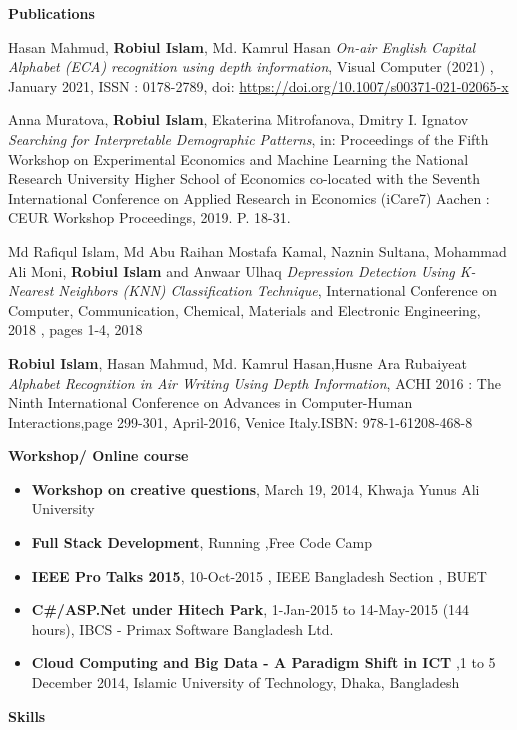 \documentclass[letterpaper,10pt]{article}
\newcommand{\resitem}[1]{\item #1 \vspace{-2pt}}
\newcommand{\resheading}[1]{{\large \colorbox{mygrey}{\begin{minipage}{\textwidth}{\textbf{#1 \vphantom{p\^{E}}}}\end{minipage}}}}
\begin{document}
\resheading{Publications}
\begin{thebibliography}{}

 \bibitem{}
 
 Hasan Mahmud, \textbf{Robiul Islam}, Md. Kamrul Hasan \emph{On-air English Capital Alphabet (ECA) recognition using depth information}, Visual Computer (2021) , January 2021,  ISSN : 0178-2789, doi: \url{https://doi.org/10.1007/s00371-021-02065-x} 

\bibitem{}
Anna Muratova, \textbf{Robiul Islam}, Ekaterina Mitrofanova, Dmitry I. Ignatov \emph{Searching for Interpretable Demographic Patterns}, in: Proceedings of the Fifth Workshop on Experimental Economics and Machine Learning the National Research University Higher School of Economics co-located with the Seventh International Conference on Applied Research in Economics (iCare7) Aachen : CEUR Workshop Proceedings, 2019. P. 18-31.

\bibitem{}
Md Rafiqul Islam, Md Abu Raihan Mostafa Kamal, Naznin Sultana, Mohammad Ali Moni, \textbf{Robiul Islam} and Anwaar Ulhaq \emph{Depression Detection Using K-Nearest Neighbors (KNN) Classification Technique}, International Conference on Computer, Communication, Chemical, Materials and Electronic Engineering, 2018 , pages 1-4, 2018  

\bibitem{}
\textbf{Robiul Islam}, Hasan Mahmud, Md. Kamrul Hasan,Husne Ara Rubaiyeat \emph{Alphabet Recognition in Air Writing Using Depth Information}, ACHI 2016 : The Ninth International Conference on Advances in Computer-Human Interactions,page 299-301, April-2016, Venice Italy.ISBN: 978-1-61208-468-8


\end{thebibliography}
\resheading{Workshop/ Online course }
\begin{itemize}

\resitem{\textbf{Workshop on creative questions}, March 19, 2014, Khwaja Yunus Ali University }
\resitem{\textbf{Full Stack Development}, Running ,Free Code Camp}
\resitem{\textbf{IEEE Pro Talks 2015}, 10-Oct-2015 , IEEE Bangladesh Section , BUET }
\resitem{\textbf{C\#/ASP.Net under Hitech Park}, 1-Jan-2015 to 14-May-2015 (144 hours), IBCS - Primax Software
Bangladesh Ltd.}
\resitem{\textbf{Cloud Computing and Big Data - A Paradigm Shift in ICT} ,1 to 5 December 2014, Islamic University of Technology, Dhaka, Bangladesh}
\end{itemize}






\resheading{Skills}
\end{document}
